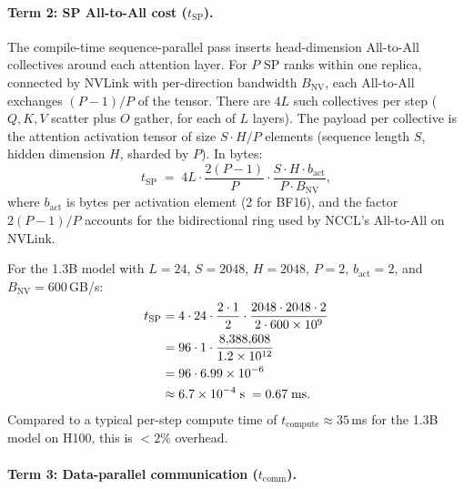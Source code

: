 \documentclass{article}
\begin{document}
\paragraph{Term 2: SP All-to-All cost ($t_{\text{SP}}$).}

The compile-time sequence-parallel pass inserts head-dimension All-to-All
collectives around each attention layer. For $P$ SP ranks within one
replica, connected by NVLink with per-direction bandwidth $B_{\text{NV}}$,
each All-to-All exchanges $(P-1)/P$ of the tensor. There are $4L$
such collectives per step ($Q, K, V$ scatter plus $O$ gather, for each
of $L$ layers). The payload per collective is the attention activation
tensor of size $S \cdot H / P$ elements (sequence length $S$, hidden
dimension $H$, sharded by $P$). In bytes:
\begin{equation}
t_{\text{SP}} \;=\;
4L \cdot \frac{2(P-1)}{P} \cdot \frac{S \cdot H \cdot b_{\text{act}}}{P \cdot B_{\text{NV}}},
\label{eq:t_sp}
\end{equation}
where $b_{\text{act}}$ is bytes per activation element (2 for BF16),
and the factor $2(P-1)/P$ accounts for the bidirectional ring used by
NCCL's All-to-All on NVLink.

For the 1.3B model with $L = 24$, $S = 2048$, $H = 2048$, $P = 2$,
$b_{\text{act}} = 2$, and $B_{\text{NV}} = 600$\,GB/s:
\begin{align}
t_{\text{SP}}
&= 4 \cdot 24 \cdot \frac{2 \cdot 1}{2} \cdot
   \frac{2048 \cdot 2048 \cdot 2}{2 \cdot 600 \times 10^9}
\notag \\
&= 96 \cdot 1 \cdot \frac{8{,}388{,}608}{1.2 \times 10^{12}}
\notag \\
&= 96 \cdot 6.99 \times 10^{-6}
\notag \\
&\approx 6.7 \times 10^{-4}\;\text{s}
\;= 0.67\;\text{ms}.
\label{eq:t_sp_concrete}
\end{align}
Compared to a typical per-step compute time of $t_{\text{compute}} \approx
35$\,ms for the 1.3B model on H100, this is $< 2\%$ overhead.

\paragraph{Term 3: Data-parallel communication ($t_{\text{comm}}$).}
\end{document}
